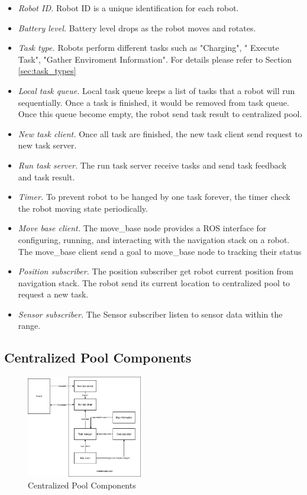 \begin{itemize}
	\item \textsl{Robot ID.} Robot ID is a unique identification for each robot.
	\item \textsl{Battery level.} Battery level drops as the robot moves and rotates.
	\item \textsl{Task type.} Robots perform different tasks such as "Charging", " Execute Task", "Gather Enviroment Information". For details please refer to Section \ref{sec:task_types}
	\item \textsl{Local task queue.} Local task queue keeps a list of tasks that a robot will run sequentially. Once a task is finished, it would be removed from task queue. Once this queue become empty, the robot send task result to centralized pool.
	\item \textsl{New task client.} Once all task are finished, the new task client send request to new task server.
	\item \textsl{Run task server.} The run task server receive tasks and send task feedback and task result.
	\item \textsl{Timer.} To prevent robot to be hanged by one task forever, the timer check the robot moving state periodically.
	\item \textsl{Move base client.} The move\_base node provides a ROS interface for configuring, running, and interacting with the navigation stack on a robot. The move\_base client send a goal to move\_base node to tracking their status  
	\item \textsl{Position subscriber.} The position subscriber get robot current position from navigation stack. The robot send its current location to centralized pool to request a new task.
	\item \textsl{Sensor subscriber.} The Sensor subscriber listen to sensor data within the range.
\end{itemize}

\subsection{Centralized Pool Components}

\begin{figure}[htbp]
	\centering
	\includegraphics[width = 0.45\textwidth]{content/images/ch3/system_component_centralized_pool.drawio.png}
	\caption{Centralized Pool Components}
	\label{fig:centralized_pool_components}
\end{figure}

